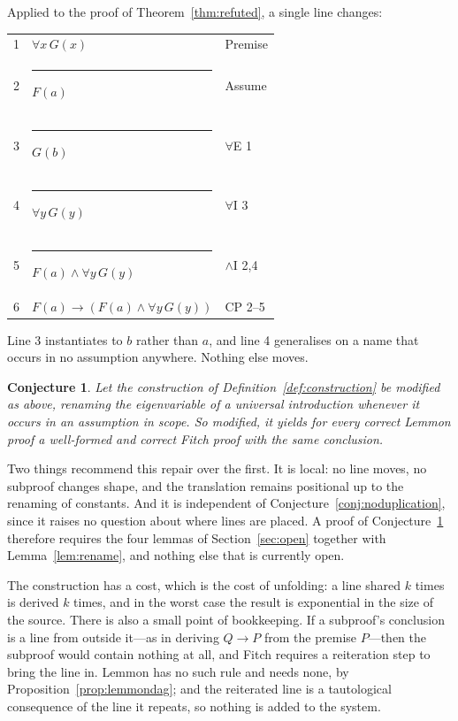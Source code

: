 \documentclass[11pt]{article}
\makeatletter
\theoremstyle{plain}
\newtheorem{conjecture}[theorem]{Conjecture}
\theoremstyle{definition}
\theoremstyle{remark}
\newcommand{\fbar}{\rule[-0.7ex]{0.4pt}{2.6ex}\hspace{0.7em}}
\newenvironment{fitchproof}
  {\begin{center}\begin{tabular}{@{}r@{\hspace{1em}}l@{\hspace{2.5em}}l@{}}}
  {\end{tabular}\end{center}}
\makeatother
\begin{document}
Applied to the proof of Theorem~\ref{thm:refuted}, a single line changes:

\begin{fitchproof}
1 &                 $\forall x\, G(x)$ & Premise \\
2 & \fbar           $F(a)$             & Assume \\
3 & \fbar           $G(b)$             & $\forall$E 1 \\
4 & \fbar           $\forall y\, G(y)$ & $\forall$I 3 \\
5 & \fbar           $F(a) \wedge \forall y\, G(y)$ & $\wedge$I 2,4 \\
6 &                 $F(a) \to (F(a) \wedge \forall y\, G(y))$ & CP 2--5 \\
\end{fitchproof}

\noindent Line 3 instantiates to $b$ rather than $a$, and line 4 generalises
on a name that occurs in no assumption anywhere. Nothing else moves.

\begin{conjecture}\label{conj:total}
Let the construction of Definition~\ref{def:construction} be modified as
above, renaming the eigenvariable of a universal introduction whenever it
occurs in an assumption in scope. So modified, it yields for every correct
Lemmon proof a well-formed and correct Fitch proof with the same conclusion.
\end{conjecture}

Two things recommend this repair over the first. It is local: no line moves,
no subproof changes shape, and the translation remains positional up to the
renaming of constants. And it is independent of
Conjecture~\ref{conj:noduplication}, since it raises no question about where
lines are placed. A proof of Conjecture~\ref{conj:total} therefore requires
the four lemmas of Section~\ref{sec:open} together with
Lemma~\ref{lem:rename}, and nothing else that is currently open.

The construction has a cost, which is the cost of unfolding: a line shared $k$
times is derived $k$ times, and in the worst case the result is exponential in
the size of the source. There is also a small point of bookkeeping. If a
subproof's conclusion is a line from outside it---as in deriving $Q \to P$
from the premise $P$---then the subproof would contain nothing at all, and
Fitch requires a reiteration step to bring the line in. Lemmon has no such
rule and needs none, by Proposition~\ref{prop:lemmondag}; and the reiterated
line is a tautological consequence of the line it repeats, so nothing is added
to the system.
\end{document}
